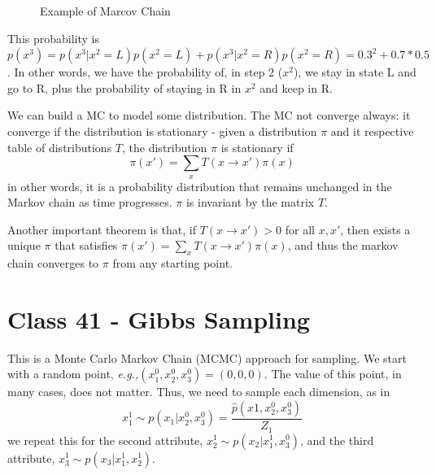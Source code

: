 \documentclass{article}
\newcommand{\eg}{\textit{e.g.,}}
\begin{document}
\begin{figure}
    \centering
    
    
    \caption{Example of Marcov Chain}
\end{figure}

This probability is $p(x^3) = p(x^3|x^2 = L)p(x^2 = L) + p(x^3|x^2 = R)p(x^2 = R) = 0.3^2 + 0.7*0.5$. In other words, we have the probability of, in step 2 ($x^2$), we stay in state L and go to R, plus the probability of staying in R in $x^2$ and keep in R.

We can build a MC to model some distribution. The MC not converge always: it converge if the distribution is stationary - given a distribution $\pi$ and it respective table of distributions $T$, the distribution $\pi$ is stationary if
\begin{equation}
    \pi(x') = \sum_x T(x \rightarrow x')\pi(x)
\end{equation}
in other words, it is a probability distribution that remains unchanged in the Markov chain as time progresses. $\pi$ is invariant by the matrix $T$.

Another important theorem is that, if $T(x \rightarrow x') > 0$ for all $x, x'$, then exists a unique $\pi$ that satisfies $\pi(x') = \sum_x T(x \rightarrow x')\pi(x)$, and thus the markov chain converges to $\pi$ from any starting point.

\section{Class 41 - Gibbs Sampling}
This is a Monte Carlo Markov Chain (MCMC) approach for sampling. We start with a random point, \eg $(x_1^0, x_2^0, x_3^0) = (0, 0, 0)$. The value of this point, in many cases, does not matter. Thus, we need to sample each dimension, as in 
\begin{equation}
    x_1^1 \sim p(x_1| x_2^0, x_3^0) = \frac{\hat{p}(x1, x_2^0, x_3^0)}{Z_1}
\end{equation}
we repeat this for the second attribute, $x_2^1 \sim p(x_2| x_1^1, x_3^0)$, and the third attribute, $x_3^1 \sim p(x_3| x_1^1, x_2^1)$.
\end{document}

